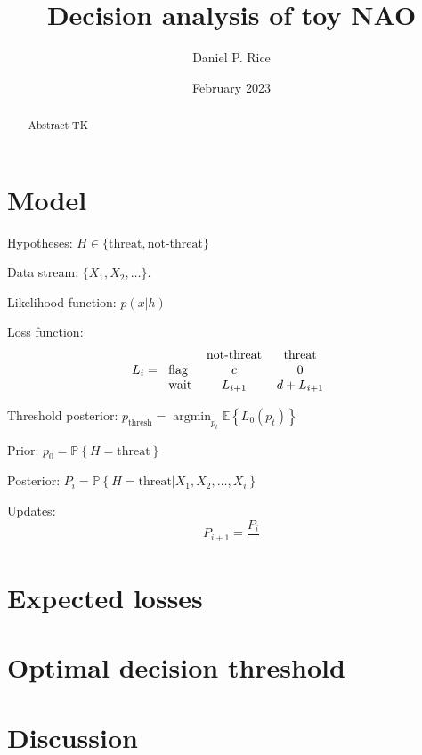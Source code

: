 \documentclass[12pt, letterpaper]{article}
\title{Decision analysis of toy NAO}
\author{Daniel P. Rice}
\date{February 2023}
\DeclareMathOperator*{\argmin}{argmin}
\begin{document}
\maketitle

\begin{abstract}
    Abstract TK
\end{abstract}

\tableofcontents

\section{Model}

Hypotheses: $H \in \{\text{threat}, \text{not-threat}\}$

Data stream: $\{X_1, X_2, \ldots\}$.

Likelihood function: $p(x | h)$

Loss function:
\begin{equation}
    L_i =
    \begin{tabular}{l c c}
        & not-threat & threat \\
        flag & $c$ & $0$ \\
        wait & $L_{i+1}$ & $d + L_{i+1}$ 
    \end{tabular}
\end{equation}

Threshold posterior: $p_{\text{thresh}} = \argmin_{p_t} \mathbb{E}\left\{L_0(p_t)\right\}$ 

Prior: $p_0 = \mathbb{P}\left\{H=\text{threat}\right\}$

Posterior: $P_i = \mathbb{P}\left\{H=\text{threat} | X_1, X_2, \ldots, X_i\right\}$

Updates:
\begin{equation}
    P_{i+1} = \frac{P_i}{}
\end{equation}

\section{Expected losses}

\section{Optimal decision threshold}

\section{Discussion}
\end{document}
